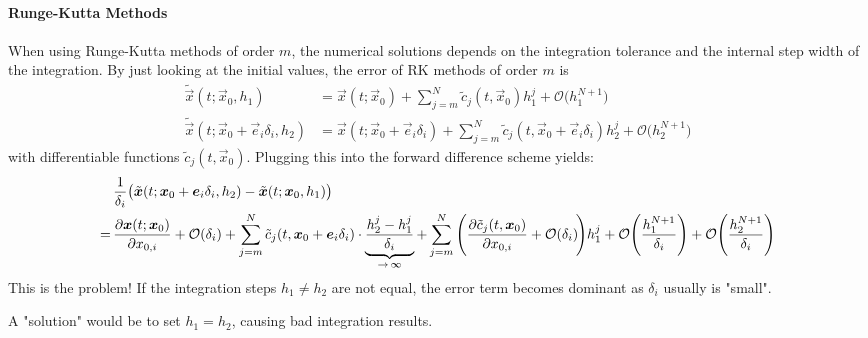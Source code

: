 				\paragraph{Runge-Kutta Methods}
					When using Runge-Kutta methods of order \(m\), the numerical solutions depends on the integration tolerance and the internal step width of the integration. By just looking at the initial values, the error of RK methods of order \(m\) is
					\begin{align*}
						\tilde{\vec{x}}(t; \vec{x}_0, h_1)                      & = \vec{x}(t; \vec{x}_0) + \sum_{j = m}^{N} \tilde{c}_j(t, \vec{x}_0) h_1^j + \mathcal{O}\big(h_1^{N + 1}\big)                                           \\
						\tilde{\vec{x}}(t; \vec{x}_0 + \vec{e}_i \delta_i, h_2) & = \vec{x}(t; \vec{x}_0 + \vec{e}_i \delta_i) + \sum_{j = m}^{N} \tilde{c}_j(t, \vec{x}_0 + \vec{e}_i \delta_i) h_2^j + \mathcal{O}\big(h_2^{N + 1}\big)
					\end{align*}
					with differentiable functions \( \tilde{c}_j(t, \vec{x}_0) \). Plugging this into the forward difference scheme yields:
					\begin{align*}
						  & \, \frac{1}{\delta_i} \big( \tilde{\bm{x}}(t; \bm{x}_0 + \bm{e}_i \delta_i, h_2) - \tilde{\bm{x}}(t; \bm{x}_0, h_1) \big)                                                                                                                                                                                                                                                                                                \\
						= & \, \pdv{\bm{x}(t; \bm{x}_0)}{x_{0, i}} + \mathcal{O}(\delta_i) + \sum_{j = m}^{N} \tilde{c}_j(t, \bm{x}_0 + \bm{e}_i \delta_i) \cdot \underbrace{\frac{h_2^j - h_1^j}{\delta_i}}_{\to\,\infty} + \sum_{j = m}^{N} \Bigg( \pdv{\tilde{c}_j(t, \bm{x}_0)}{x_{0, i}} + \mathcal{O}(\delta_i) \!\Bigg) h_1^j + \mathcal{O}\Bigg( \frac{h_1^{N + 1}}{\delta_i} \Bigg) + \mathcal{O}\Bigg( \frac{h_2^{N + 1}}{\delta_i} \Bigg)
					\end{align*}
					This is the problem! If the integration steps \( h_1 \neq h_2 \) are not equal, the error term becomes dominant as \( \delta_i \) usually is "small".

					A "solution" would be to set \( h_1 = h_2 \), causing bad integration results.

